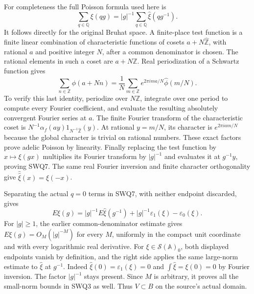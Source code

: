 For completeness the full Poisson formula used here is
\begin{equation}\tag{SWQ7}
 \sum_{q\in\mathbb Q}\xi(qg)
   =|g|^{-1}\sum_{q\in\mathbb Q}\widehat\xi(qg^{-1}).
\end{equation}
It follows directly for the original Bruhat space. A finite-place
test function is a finite linear combination of characteristic
functions of cosets $a+N\widehat{\mathbb Z}$, with rational $a$ and
positive integer $N$, after a common denominator is chosen. The
rational elements in such a coset are $a+N\mathbb Z$. Real
periodization of a Schwartz function gives
\[
 \sum_{n\in\mathbb Z}\phi(a+Nn)
  =\frac1N\sum_{m\in\mathbb Z}
       e^{2\pi i ma/N}\widehat\phi(m/N).
\]
To verify this last identity, periodize over $N\mathbb Z$, integrate
over one period to compute every Fourier coefficient, and evaluate
the resulting absolutely convergent Fourier series at $a$.
The finite Fourier transform of the characteristic coset is
$N^{-1}\alpha_f(ay)1_{N^{-1}\widehat{\mathbb Z}}(y)$.
At rational $y=m/N$, its character is $e^{2\pi i am/N}$ because
the global character is trivial on rational numbers. These exact
factors prove adelic Poisson by linearity. Finally replacing the
test function by $x\mapsto\xi(gx)$ multiplies its Fourier transform
by $|g|^{-1}$ and evaluates it at $g^{-1}y$, proving SWQ7.
The same real Fourier inversion and finite character orthogonality
give $\widehat{\widehat\xi}(x)=\xi(-x)$.

Separating the actual $q=0$ terms in SWQ7, with neither endpoint
discarded, gives
\begin{equation}\tag{SWQ8}
 E\xi(g)=|g|^{-1}E\widehat\xi(g^{-1})
             +|g|^{-1}\varepsilon_1(\xi)-\varepsilon_0(\xi).
\end{equation}
For $|g|\ge1$, the earlier common-denominator estimate gives
$E\xi(g)=O_M(|g|^{-M})$ for every $M$, uniformly in the compact
unit coordinate and with every logarithmic real derivative.
For $\xi\in\mathcal S(\mathbb A)_0$, both displayed endpoints
vanish by definition, and the right side applies the same large-norm
estimate to $\widehat\xi$ at $g^{-1}$. Indeed
$\widehat\xi(0)=\varepsilon_1(\xi)=0$ and
$\int\widehat\xi=\xi(0)=0$ by Fourier inversion.
The factor $|g|^{-1}$ stays present. Since $M$ is arbitrary, it
proves all the small-norm bounds in SWQ3 as well. Thus $V\subset B$
on the source's actual domain.


